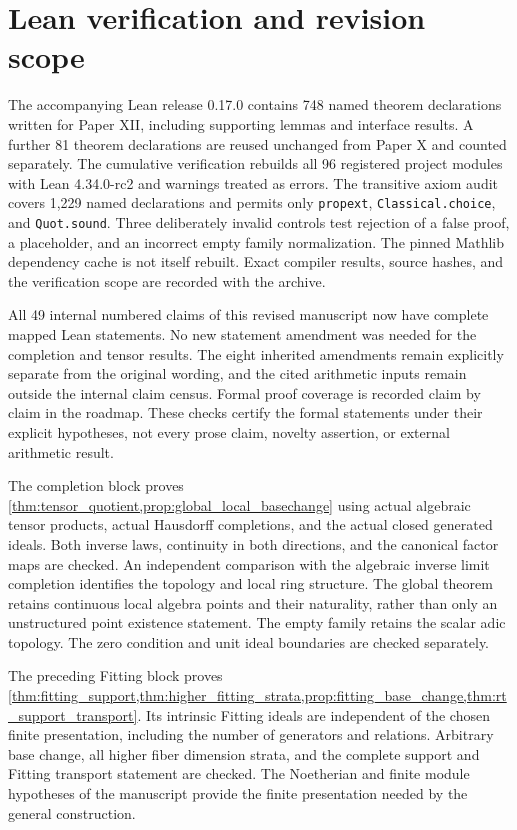\documentclass[11pt]{amsart}
\theoremstyle{definition}
\theoremstyle{remark}
\begin{document}
\section*{Lean verification and revision scope}

The accompanying Lean release 0.17.0 contains 748 named theorem declarations written for Paper XII, including supporting lemmas and interface results. A further 81 theorem declarations are reused unchanged from Paper X and counted separately. The cumulative verification rebuilds all 96 registered project modules with Lean 4.34.0-rc2 and warnings treated as errors. The transitive axiom audit covers 1,229 named declarations and permits only \texttt{propext}, \texttt{Classical.choice}, and \texttt{Quot.sound}. Three deliberately invalid controls test rejection of a false proof, a placeholder, and an incorrect empty family normalization. The pinned Mathlib dependency cache is not itself rebuilt. Exact compiler results, source hashes, and the verification scope are recorded with the archive.

All 49 internal numbered claims of this revised manuscript now have complete mapped Lean statements. No new statement amendment was needed for the completion and tensor results. The eight inherited amendments remain explicitly separate from the original wording, and the cited arithmetic inputs remain outside the internal claim census. Formal proof coverage is recorded claim by claim in the roadmap. These checks certify the formal statements under their explicit hypotheses, not every prose claim, novelty assertion, or external arithmetic result.

The completion block proves \cref{thm:tensor_quotient,prop:global_local_basechange} using actual algebraic tensor products, actual Hausdorff completions, and the actual closed generated ideals. Both inverse laws, continuity in both directions, and the canonical factor maps are checked. An independent comparison with the algebraic inverse limit completion identifies the topology and local ring structure. The global theorem retains continuous local algebra points and their naturality, rather than only an unstructured point existence statement. The empty family retains the scalar adic topology. The zero condition and unit ideal boundaries are checked separately.

The preceding Fitting block proves \cref{thm:fitting_support,thm:higher_fitting_strata,prop:fitting_base_change,thm:rt_support_transport}. Its intrinsic Fitting ideals are independent of the chosen finite presentation, including the number of generators and relations. Arbitrary base change, all higher fiber dimension strata, and the complete support and Fitting transport statement are checked. The Noetherian and finite module hypotheses of the manuscript provide the finite presentation needed by the general construction.
\end{document}
